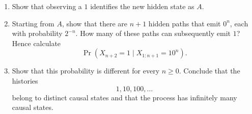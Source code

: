 \documentclass[11pt]{article}
\begin{document}
\begin{exercise}
\begin{enumerate}
      \begin{enumerate}
        \item Show that observing a $1$ identifies the new hidden state as
          $A$.

        \item Starting from $A$, show that there are $n+1$ hidden paths that
          emit $0^n$, each with probability $2^{-n}$. How many of these paths
          can subsequently emit $1$? Hence calculate
          \[
            \Pr(X_{n+2}=1\mid X_{1:n+1}=10^n).
          \]

        \item Show that this probability is different for every $n\geq0$.
          Conclude that the histories
          \[
            1,10,100,\ldots
          \]
          belong to distinct causal states and that the process has infinitely
          many causal states.
      \end{enumerate}
  \end{enumerate}
\end{exercise}
\end{document}
